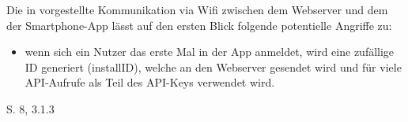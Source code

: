 	Die in  vorgestellte Kommunikation via Wifi zwischen dem Webserver und dem der Smartphone-App lässt auf den ersten Blick folgende potentielle Angriffe zu\cite{Fuller2017}: 
	\begin{itemize}
	    \item wenn sich ein Nutzer das erste Mal in der App anmeldet, wird eine zufällige ID generiert (installID), welche an den Webserver gesendet wird und für viele API-Aufrufe als Teil des API-Keys verwendet wird.
	\end{itemize}
	
	\LARGE{\citeauthor{Fuller2017} S. 8, 3.1.3}
	